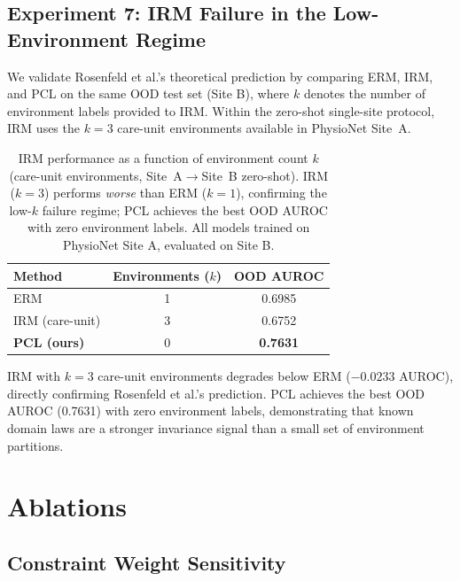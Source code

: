 \documentclass{article}
\begin{document}
\subsection{Experiment 7: IRM Failure in the Low-Environment Regime}
\label{sec:irm_failure}

We validate Rosenfeld et al.'s theoretical prediction by comparing ERM, IRM, and PCL on the same OOD test set (Site B), where $k$ denotes the number of environment labels provided to IRM. Within the zero-shot single-site protocol, IRM uses the $k{=}3$ care-unit environments available in PhysioNet Site~A.

\begin{table}[htbp]
\caption{IRM performance as a function of environment count $k$ (care-unit environments, Site~A$\to$Site~B zero-shot). IRM ($k{=}3$) performs \emph{worse} than ERM ($k{=}1$), confirming the low-$k$ failure regime; PCL achieves the best OOD AUROC with zero environment labels. All models trained on PhysioNet Site A, evaluated on Site B.}
\label{tab:irm_failure}
\centering
\small
\begin{tabular}{@{}lcc@{}}
\toprule
Method & Environments ($k$) & OOD AUROC \\
\midrule
ERM & 1 & 0.6985 \\
IRM (care-unit) & 3 & 0.6752 \\
\textbf{PCL (ours)} & 0 & \textbf{0.7631} \\
\bottomrule
\end{tabular}
\end{table}

IRM with $k=3$ care-unit environments degrades below ERM ($-0.0233$ AUROC), directly confirming Rosenfeld et al.'s prediction.
PCL achieves the best OOD AUROC (0.7631) with zero environment labels, demonstrating that known domain laws are a stronger invariance signal than a small set of environment partitions.

\section{Ablations}
\label{sec:ablations}

\subsection{Constraint Weight Sensitivity}
\end{document}
